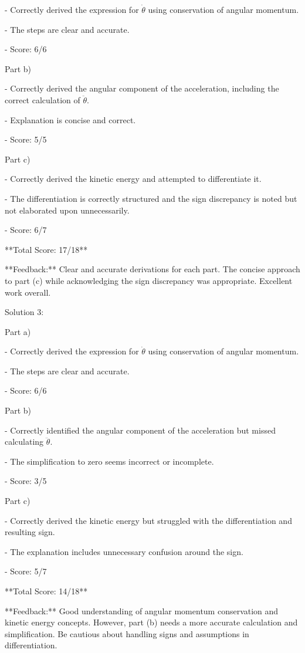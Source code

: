 \documentclass[a4paper,11pt]{article}
\begin{document}
- Correctly derived the expression for \( \dot{\theta} \) using conservation of angular momentum.

- The steps are clear and accurate.

- Score: 6/6

Part b)

- Correctly derived the angular component of the acceleration, including the correct calculation of \( \ddot{\theta} \).

- Explanation is concise and correct.

- Score: 5/5

Part c)

- Correctly derived the kinetic energy and attempted to differentiate it.

- The differentiation is correctly structured and the sign discrepancy is noted but not elaborated upon unnecessarily.

- Score: 6/7

**Total Score: 17/18**

**Feedback:** Clear and accurate derivations for each part. The concise approach to part (c) while acknowledging the sign discrepancy was appropriate. Excellent work overall.

Solution 3:

Part a)

- Correctly derived the expression for \( \dot{\theta} \) using conservation of angular momentum.

- The steps are clear and accurate.

- Score: 6/6

Part b)

- Correctly identified the angular component of the acceleration but missed calculating \( \ddot{\theta} \).

- The simplification to zero seems incorrect or incomplete.

- Score: 3/5

Part c)

- Correctly derived the kinetic energy but struggled with the differentiation and resulting sign.

- The explanation includes unnecessary confusion around the sign.

- Score: 5/7

**Total Score: 14/18**

**Feedback:** Good understanding of angular momentum conservation and kinetic energy concepts. However, part (b) needs a more accurate calculation and simplification. Be cautious about handling signs and assumptions in differentiation.
\end{document}
